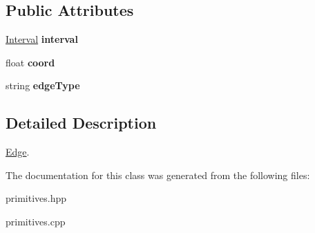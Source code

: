\subsection*{Public Attributes}
\begin{DoxyCompactItemize}
\item 
\mbox{\label{classEdge_aea4b96c270f7cf0ab157747898cd9d6b}} 
\hyperlink{classInterval}{Interval} {\bfseries interval}
\item 
\mbox{\label{classEdge_aa0650b73d48caaeffbc9cf7a0ac2725b}} 
float {\bfseries coord}
\item 
\mbox{\label{classEdge_a84c46c658b36890a71d6bfe82f02fea6}} 
string {\bfseries edge\+Type}
\end{DoxyCompactItemize}


\subsection{Detailed Description}
\hyperlink{classEdge}{Edge}. 

The documentation for this class was generated from the following files\+:\begin{DoxyCompactItemize}
\item 
primitives.\+hpp\item 
primitives.\+cpp\end{DoxyCompactItemize}
